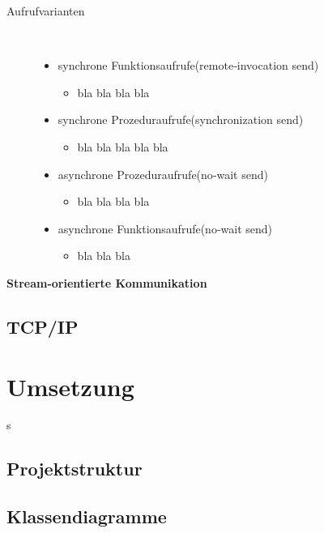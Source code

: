 \documentclass[a4paper,12pt]{article}
\begin{document}
\newpage
\noindent
\begin{description}
    \item[Aufrufvarianten] ~\par
    \begin{itemize}
        \item synchrone Funktionsaufrufe(remote‑invocation send)
        \begin{itemize}
            \item{bla bla bla bla}
        \end{itemize}
        \item synchrone Prozeduraufrufe(synchronization send)
        \begin{itemize}
            \item{bla bla bla bla bla}
        \end{itemize}
        \item asynchrone Prozeduraufrufe(no‑wait send)
        \begin{itemize}
            \item{bla bla bla bla}
        \end{itemize}
        \item asynchrone Funktionsaufrufe(no‑wait send)
        \begin{itemize}
            \item{bla bla bla\\}
        \end{itemize}
    \end{itemize} 
\end{description}
\textbf{Stream-orientierte Kommunikation}\\
\cite{communication2}
\subsection{TCP/IP}




\section{Umsetzung}s

\subsection{Projektstruktur}

\subsection{Klassendiagramme}
\end{document}
